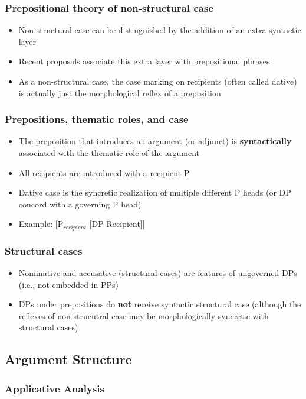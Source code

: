 \documentclass{beamer}
\begin{document}
\begin{frame}
	\frametitle{Prepositional theory of non-structural case}
	\begin{itemize}
		\item Non-structural case can be distinguished by the addition of an extra syntactic layer \citep{Bittner.1996,Bayer.2001}
		\item Recent proposals associate this extra layer with prepositional phrases \citep{Asbury.2005,Asbury.2007,Rezac.2008,Caha.2009}
		\item As a non-structural case, the case marking on recipients (often called dative) is actually just the morphological reflex of a preposition
	\end{itemize}
\end{frame}

\begin{frame}
	\frametitle{Prepositions, thematic roles, and case}
	\begin{itemize}
		\item The preposition that introduces an argument (or adjunct) is \textbf{syntactically} associated with the thematic role of the argument
		\item All recipients are introduced with a recipient P
		\item Dative case is the syncretic realization of multiple different P heads (or DP concord with a governing P head)
		\item Example: [P$_{recipient}$ [DP Recipient]]
	\end{itemize}
\end{frame}

\begin{frame}
	\frametitle{Structural cases}
	\begin{itemize}
		\item Nominative and accusative (structural cases) are features of ungoverned DPs (i.e., not embedded in PPs)
		\item DPs under prepositions do \textbf{not} receive syntactic structural case (although the reflexes of non-strucutral case may be morphologically syncretic with structural cases)
	\end{itemize}
\end{frame}

\subsection{Argument Structure}
\begin{frame}
	\frametitle{Applicative Analysis}
\end{frame}
\end{document}
